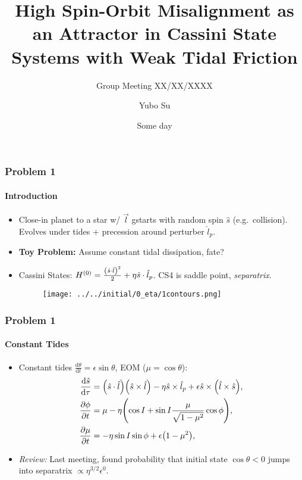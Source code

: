 \documentclass[dvipsnames, 11pt]{beamer}
\newcommand*{\rd}[2]{\frac{\mathrm{d}#1}{\mathrm{d}#2}}
\newcommand*{\pd}[2]{\frac{\partial#1}{\partial#2}}
\DeclarePairedDelimiter\p{\lparen}{\rparen}
\begin{document}
\title[Cassini S-O Misalignment]{High Spin-Orbit Misalignment as an Attractor in
Cassini State Systems with Weak Tidal Friction}
\subtitle{Group Meeting XX/XX/XXXX}
\author{Yubo Su}
\date{Some day}

\maketitle

\begin{frame}
    \frametitle{Problem 1}
    \framesubtitle{Introduction}

    \begin{itemize}
        \item Close-in planet to a star w/ $\vec{l}$ gstarts with random spin
            $\hat{s}$ (e.g.\ collision). Evolves under tides + precession around
            perturber $\hat{l}_p$.

        \item \textbf{Toy Problem:} Assume constant tidal dissipation, fate?

        \item Cassini States: $H^{(0)} = \frac{\p*{\hat{s} \cdot \hat{l}}^2}{2}
            + \eta \hat{s} \cdot \hat{l}_p$. CS4 is saddle point,
            \emph{separatrix}.

        \begin{figure}[t]
            \centering
            \texttt{[image: ../../initial/0\_eta/1contours.png]}
        \end{figure}
    \end{itemize}
\end{frame}

\begin{frame}
    \frametitle{Problem 1}
    \framesubtitle{Constant Tides}

    \begin{itemize}
        \item Constant tides $\rd{\theta}{t} = \epsilon \sin\theta$,
            EOM ($\mu = \cos \theta$):
            \begin{align*}
                \rd{\hat{s}}{\tau}
                    &= \p*{\hat{s} \cdot \hat{l}}\p*{\hat{s} \times \hat{l}}
                        - \eta\hat{s} \times \hat{l}_p +
                        \epsilon \hat{s} \times \p*{\hat{l} \times \hat{s}}
                        ,\\
                \pd{\phi}{t} &= \mu - \eta
                    \p*{\cos I + \sin I \frac{\mu}{\sqrt{1 - \mu^2}}
                        \cos \phi},\\
                \pd{\mu}{t} &= -\eta \sin I \sin \phi
                    + \epsilon \p*{1 - \mu^2},
            \end{align*}

        \item \emph{Review:} Last meeting, found probability that initial state
            $\cos\theta < 0$ jumps into separatrix $\propto
            \eta^{3/2}\epsilon^0$.
    \end{itemize}
\end{frame}
\end{document}
